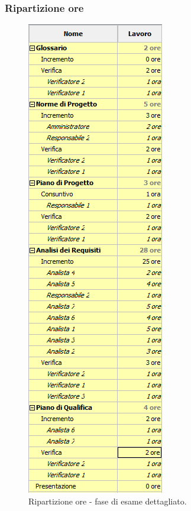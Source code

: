 \documentclass[a4paper]{article}
\begin{document}
			\subsubsection{Ripartizione ore}
				\begin{figure}[H]
					\centering
					\includegraphics[scale=0.6]{ro_dettaglio}
					\caption{Ripartizione ore - fase di esame dettagliato.}
				\end{figure}
				
\end{document}
